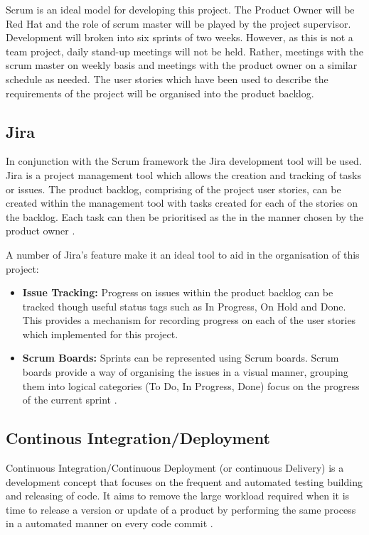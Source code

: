 	Scrum is an ideal model for developing this project. The Product Owner will be Red Hat and the role of scrum master will be played by the project supervisor. Development will broken into six sprints of two weeks. However, as this is not a team project, daily stand-up meetings will not be held. Rather, meetings with the scrum master on weekly basis and meetings with the product owner on a similar schedule as needed. The user stories which have been used to describe the requirements of the project will be organised into the product backlog.
	
	\subsection{Jira}
	In conjunction with the Scrum framework the Jira development tool will be used. Jira is a project management tool which allows the creation and tracking of tasks or issues. The product backlog, comprising of the project user stories, can be created within the management tool with tasks created for each of the stories on the backlog. Each task can then be prioritised as the in the manner chosen by the product owner \citep{jira}.
	
	A number of Jira's feature make it an ideal tool to aid in the organisation of this project:
	\begin{itemize}
		\item \textbf{Issue Tracking:} Progress on issues within the product backlog can be tracked though useful status tags such as In Progress, On Hold and Done. This provides a mechanism for recording progress on each of the user stories which implemented for this project. 
		\item \textbf{Scrum Boards: } Sprints can be represented using Scrum boards. Scrum boards provide a way of organising the issues in a visual manner, grouping them into logical categories (To Do, In Progress, Done) focus on the progress of the current sprint \cite{scruminc}.
	\end{itemize}

	\subsection{Continous Integration/Deployment}
	Continuous Integration/Continuous Deployment (or continuous Delivery) is a development concept that focuses on the frequent and automated testing building and releasing of code. It aims to remove the large workload required when it is time to release a version or update of a product by performing the same process in a automated manner on every code commit \citep{pittet}.
	
